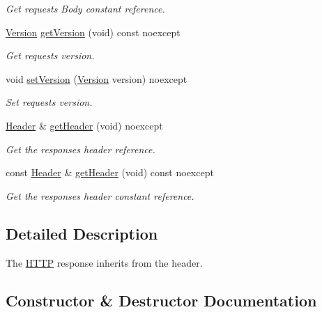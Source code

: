 \begin{DoxyCompactItemize}
\begin{DoxyCompactList}\small\item\em Get request\textquotesingle{}s Body constant reference. \end{DoxyCompactList}\item 
\mbox{\hyperlink{structo_z_1_1_h_t_t_p_1_1_version}{Version}} \mbox{\hyperlink{classo_z_1_1_h_t_t_p_1_1_response_a13290e5dcd0ae675e0c48af54c074dbc}{get\+Version}} (void) const noexcept
\begin{DoxyCompactList}\small\item\em Get request\textquotesingle{}s version. \end{DoxyCompactList}\item 
void \mbox{\hyperlink{classo_z_1_1_h_t_t_p_1_1_response_a676c9d140574b68e28120b827187b06a}{set\+Version}} (\mbox{\hyperlink{structo_z_1_1_h_t_t_p_1_1_version}{Version}} version) noexcept
\begin{DoxyCompactList}\small\item\em Set request\textquotesingle{}s version. \end{DoxyCompactList}\item 
\mbox{\hyperlink{classo_z_1_1_h_t_t_p_1_1_header}{Header}} \& \mbox{\hyperlink{classo_z_1_1_h_t_t_p_1_1_response_aedf5ae6b504bdd4cc28dc57f54a581c8}{get\+Header}} (void) noexcept
\begin{DoxyCompactList}\small\item\em Get the response\textquotesingle{}s header reference. \end{DoxyCompactList}\item 
const \mbox{\hyperlink{classo_z_1_1_h_t_t_p_1_1_header}{Header}} \& \mbox{\hyperlink{classo_z_1_1_h_t_t_p_1_1_response_a5823071c16d2ef27b64c5d9ddcb7a158}{get\+Header}} (void) const noexcept
\begin{DoxyCompactList}\small\item\em Get the response\textquotesingle{}s header constant reference. \end{DoxyCompactList}\end{DoxyCompactItemize}


\subsection{Detailed Description}
The \mbox{\hyperlink{namespaceo_z_1_1_h_t_t_p}{H\+T\+TP}} response inherits from the header. 

\subsection{Constructor \& Destructor Documentation}
\mbox{\label{classo_z_1_1_h_t_t_p_1_1_response_a0f77c44152124e9fb1d123138fd44552}} 
